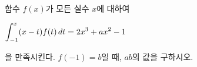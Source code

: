 함수 $f(x)$가 모든 실수 $x$에 대하여 \par\smallskip\noindent\hspace*{1.5em}$\displaystyle\int_{-1}^{x} (x-t)f(t)\mkern3mu dt=2x^3+ax^2-1$\par\smallskip\noindent 을 만족시킨다. $f(-1)=b$일 때, $ab$의 값을 구하시오. 
